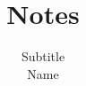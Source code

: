 

\title{Notes}

\author{%
    Subtitle \\
    Name
}


\frontmatter
\begin{titlingpage}
\maketitle
\tableofcontents*
\end{titlingpage}
\mainmatter
\twocolumn


